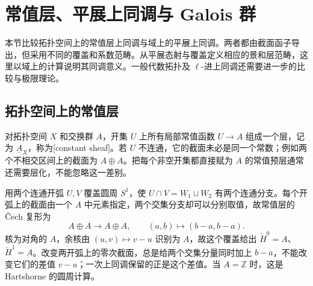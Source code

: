 

\section{常值层、平展上同调与 Galois 群}
\label{b4:sec:C04}

本节比较拓扑空间上的常值层上同调与域上的平展上同调。两者都由截面函子导出，但采用不同的覆盖和系数范畴。从平展态射与覆盖定义相应的景和层范畴，这里以域上的计算说明其同调意义。一般代数拓扑及 \(\ell\)-进上同调还需要进一步的比较与极限理论。

\subsection{拓扑空间上的常值层}
\label{b4:subsec:C04:01}

对拓扑空间 \(X\) 和交换群 \(A\)，开集 \(U\) 上所有局部常值函数 \(U\rightarrow A\) 组成一个层，记为 \(\underline A_X\)，称为[constant sheaf]。若 \(U\) 不连通，它的截面未必是同一个常数；例如两个不相交区间上的截面为 \(A\oplus A\)。把每个非空开集都直接赋为 \(A\) 的常值预层通常还需要层化，不能忽略这一差别。

\ProseParagraphBreak
用两个连通开弧 \(U,V\) 覆盖圆周 \(S^1\)，使 \(U\cap V=W_1\sqcup W_2\) 有两个连通分支。每个开弧上的截面由一个 \(A\) 中元素指定，两个交集分支却可以分别取值，故常值层的 Čech 复形为
\[
	A\oplus A\longrightarrow A\oplus A, \qquad(a,b)\longmapsto(b-a,b-a).
\]
核为对角的 \(A\)，余核由 \((u,v)\mapsto v-u\) 识别为 \(A\)，故这个覆盖给出 \(\check H^0=A\)、\(\check H^1=A\)。改变两开弧上的零次截面，总是给两个交集分量同时加上 \(b-a\)，不能改变它们的差值 \(v-u\)；一次上同调保留的正是这个差值。当 \(A=\mathbb Z\) 时，这是 Hartshorne 的圆周计算\cite[Chapter III, Example 4.0.4, p. 220]{Hartshorne1977}。

